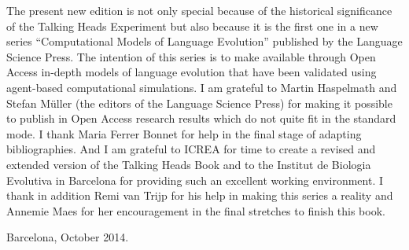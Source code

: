 The present new edition is not only special because of the historical significance of the Talking Heads 
Experiment but also because it is the first one in a new series ``Computational Models of 
Language Evolution'' published by the Language Science Press. The intention of this series is to make available 
through Open Access in-depth models of language evolution that have been validated using agent-based 
computational simulations. I am grateful to Martin Haspelmath and Stefan M\"uller (the editors of the Language Science Press)
for making it possible to publish in Open Access research results which do not quite fit in the standard mode. I thank 
Maria Ferrer Bonnet for help in the final stage of adapting bibliographies. And I am grateful to ICREA for time to 
create a revised and extended version of the Talking Heads Book and to the Institut de Biologia Evolutiva in Barcelona 
for providing such an excellent working environment. I thank in addition Remi van Trijp for his help in making this series a reality 
and Annemie Maes for her encouragement in the final stretches to finish this book. 

\vspace{1cm}

\hfill Barcelona, October 2014.  


